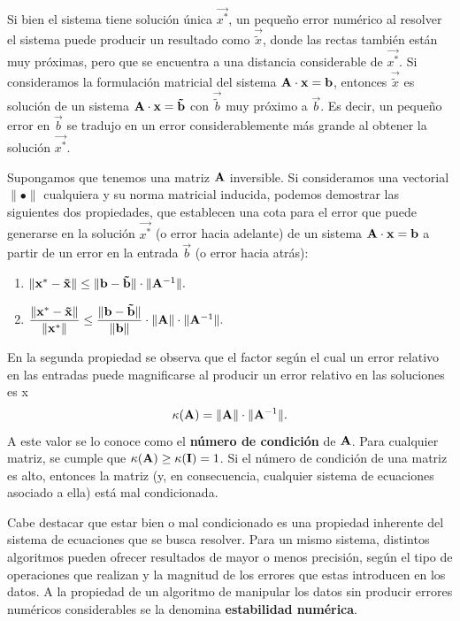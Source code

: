 Si bien el sistema tiene solución única $\vec{x^\ast}$, un pequeño error
numérico al resolver el sistema puede producir un resultado como
$\vec{\tilde x}$, donde las rectas también están muy próximas, pero que
se encuentra a una distancia considerable de $\vec{x^\ast}$.
Si consideramos la formulación matricial del sistema $\mathbf{A} \cdot \mathbf{x} =
\mathbf{b}$, entonces $\vec{\tilde x}$ es solución de un sistema $\mathbf{A} \cdot
\mathbf{x} = \mathbf{\tilde b}$ con $\vec{\tilde b}$ muy próximo a $\vec{b}$.
Es decir, un pequeño error en $\vec{b}$ se tradujo en un error
considerablemente más grande al obtener la solución $\vec{x^\ast}$.

Supongamos que tenemos una matriz $\mathbf{A}$ inversible. Si consideramos una
vectorial $\lVert \bullet \rVert$ cualquiera y su norma matricial inducida,
podemos demostrar las siguientes dos propiedades, que establecen una cota para
el error que puede generarse en la solución $\vec{x^\ast}$ (o error hacia
adelante) de un sistema $\mathbf{A} \cdot \mathbf{x} = \mathbf{b}$ a partir de un error
en la entrada $\vec{b}$ (o error hacia atrás):
\begin{enumerate}[label=(\roman*)]
\item $\lVert \mathbf{x^\ast} - \mathbf{\tilde x} \rVert \leq
    \lVert \mathbf{b} - \mathbf{\tilde b} \rVert \cdot
    \lVert \mathbf{A}^{-1} \rVert.$
\item $\dfrac{\lVert \mathbf{x^\ast} - \mathbf{\tilde x} \rVert}
        {\lVert \mathbf{x^\ast} \rVert} \leq
    \dfrac{\lVert \mathbf{b} - \mathbf{\tilde b} \rVert}
        {\lVert \mathbf{b} \rVert} \cdot
    \lVert \mathbf{A} \rVert \cdot
    \lVert \mathbf{A}^{-1} \rVert.$
\end{enumerate}

En la segunda propiedad se observa que el factor según el cual un error
relativo en las entradas puede magnificarse al producir un error relativo en
las soluciones es
x\[ \kappa(\mathbf{A}) = \lVert \mathbf{A} \rVert \cdot \lVert \mathbf{A}^{-1} \rVert.
\]
A este valor se lo conoce como el \textbf{número de condición} de $\mathbf{A}$.
Para cualquier matriz, se cumple que $\kappa(\mathbf{A}) \geq \kappa(\mathbf{I})
= 1$. Si el número de condición de una matriz es alto, entonces la matriz
(y, en consecuencia, cualquier sistema de ecuaciones asociado a ella) está
mal condicionada.

Cabe destacar que estar bien o mal condicionado es una propiedad inherente del
sistema de ecuaciones que se busca resolver. Para un mismo sistema, distintos
algoritmos pueden ofrecer resultados de mayor o menos precisión, según el tipo
de operaciones que realizan y la magnitud de los errores que estas introducen
en los datos. A la propiedad de un algoritmo de manipular los datos sin
producir errores numéricos considerables se la denomina \textbf{estabilidad
numérica}.
